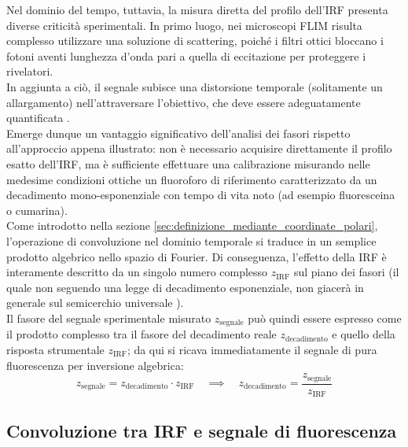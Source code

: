Nel dominio del tempo, tuttavia, la misura diretta del profilo dell'IRF presenta diverse criticità sperimentali. In primo luogo, nei microscopi FLIM risulta complesso utilizzare una soluzione di scattering, poiché i filtri ottici bloccano i fotoni aventi lunghezza d'onda pari a quella di eccitazione per proteggere i rivelatori.\\
In aggiunta a ciò, il segnale subisce una distorsione temporale (solitamente un allargamento) nell'attraversare l'obiettivo, che deve essere adeguatamente quantificata \cite{ranjitFitfreeAnalysisFluorescence2018}.\\
Emerge dunque un vantaggio significativo dell'analisi dei fasori rispetto all'approccio appena illustrato: non è necessario acquisire direttamente il profilo esatto dell'IRF, ma è sufficiente effettuare una calibrazione misurando nelle medesime condizioni ottiche un fluoroforo di riferimento caratterizzato da un decadimento mono-esponenziale con tempo di vita noto (ad esempio fluoresceina o cumarina)\cite{ranjitFitfreeAnalysisFluorescence2018}.\\
Come introdotto nella sezione \ref{sec:definizione_mediante_coordinate_polari}, l'operazione di convoluzione nel dominio temporale si traduce in un semplice prodotto algebrico nello spazio di Fourier. Di conseguenza, l'effetto della IRF è interamente descritto da un singolo numero complesso $z_{\text{IRF}}$ sul piano dei fasori (il quale non seguendo una legge di decadimento esponenziale, non giacerà in generale sul semicerchio universale \cite{ranjitFitfreeAnalysisFluorescence2018}). \\
Il fasore del segnale sperimentale misurato $z_{\text{segnale}}$ può quindi essere espresso come il prodotto complesso tra il fasore del decadimento reale $z_{\text{decadimento}}$ e quello della risposta strumentale $z_{\text{IRF}}$; da qui si ricava immediatamente il segnale di pura fluorescenza per inversione algebrica:
\begin{equation}
    z_{\text{segnale}} = z_{\text{decadimento}} \cdot z_{\text{IRF}} \quad \implies \quad z_{\text{decadimento}} = \frac{z_{\text{segnale}}}{z_{\text{IRF}}}
    \label{eq:convoluzione_fasori}
\end{equation}





\subsection{Convoluzione tra IRF e segnale di fluorescenza} %

